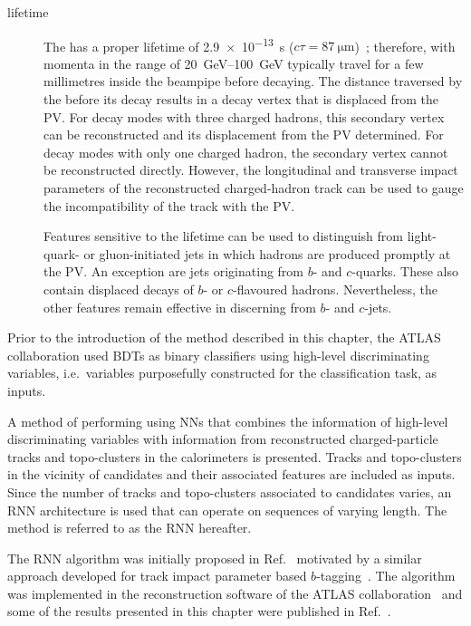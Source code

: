 \begin{description}
\item[\tauleptonC lifetime] The \taulepton has a proper lifetime of
  \SI{2.9e-13}{\second} ($c \tau = \SI{87}{\micro\metre}$)~\cite{pdg2020};
  therefore, \tauleptons with momenta in the range of \SIrange{20}{100}{\GeV}
  typically travel for a few millimetres inside the beampipe before
  decaying. The distance traversed by the \taulepton before its decay results in
  a decay vertex that is displaced from the PV. For \tauleptonC decay modes with
  three charged hadrons, this secondary vertex can be reconstructed and its
  displacement from the PV determined. For decay modes with only one charged
  hadron, the secondary vertex cannot be reconstructed directly. However, the
  longitudinal and transverse impact parameters of the reconstructed
  charged-hadron track can be used to gauge the incompatibility of the track
  with the PV. %

  Features sensitive to the \tauleptonC lifetime can be used to distinguish
  \tauhad from light-quark- or gluon-initiated jets in which hadrons are
  produced promptly at the PV. An exception are jets originating from $b$- and
  $c$-quarks. These also contain displaced decays of $b$- or $c$-flavoured
  hadrons. Nevertheless, the other features remain effective in discerning
  \tauhad from $b$- and $c$-jets.

\end{description}
Prior to the introduction of the method described in this chapter, the
ATLAS collaboration used BDTs as binary classifiers using high-level
discriminating variables, i.e.\ variables purposefully constructed for
the classification task, as inputs.

A method of performing \tauid using NNs that combines the
information of high-level discriminating variables with information from
reconstructed charged-particle tracks and topo-clusters in the calorimeters is
presented. Tracks and topo-clusters in the vicinity of \tauhadvis candidates and
their associated features are included as inputs. Since the
number of tracks and topo-clusters associated to \tauhadvis candidates varies,
an RNN architecture is used that can operate on sequences of varying length. The
method is referred to as the RNN \tauid hereafter.

The RNN \tauid algorithm was initially proposed in Ref.~\cite{cdeutsch-master}
motivated by a similar approach developed for track impact parameter based
$b$-tagging~\cite{ATL-PHYS-PUB-2017-003}. The algorithm was implemented in the
reconstruction software of the ATLAS collaboration~\cite{ATL-SOFT-PUB-2021-001}
and some of the results presented in this chapter were published in
Ref.~\cite{ATL-PHYS-PUB-2019-033}.

